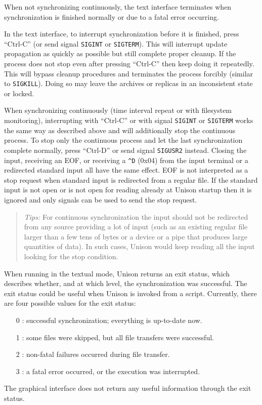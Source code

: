 \documentclass{article}
\begin{document}
\begin{textui}
When not synchronizing continuously, the text interface terminates when
synchronization is finished normally or due to a fatal error occurring.

In the text interface, to interrupt synchronization before it is finished,
press ``Ctrl-C'' (or send signal \verb|SIGINT| or \verb|SIGTERM|). This will
interrupt update propagation as quickly as possible but still complete proper
cleanup. If the process does not stop even after pressing ``Ctrl-C'' then keep
doing it repeatedly.  This will bypass cleanup procedures and terminates the
process forcibly (similar to \verb|SIGKILL|).  Doing so may leave the archives
or replicas in an inconsistent state or locked.

When synchronizing continuously (time interval repeat or with filesystem
monitoring), interrupting with ``Ctrl-C'' or with signal \verb|SIGINT| or
\verb|SIGTERM| works the same way as described above and will additionally stop
the continuous process. To stop only the continuous process and let the last
synchronization complete normally, press ``Ctrl-D'' or send signal
\verb|SIGUSR2| instead.
Closing the input, receiving an EOF, or receiving a \verb|^D| (0x04) from the
input terminal or a redirected standard input all have the same effect. EOF is
not interpreted as a stop request when standard input is redirected from a
regular file. If the standard input is not open or is not open for reading
already at Unison startup then it is ignored and only signals can be used to
send the stop request.

\begin{quote}
  {\em Tips:} For continuous synchronization the input should not be redirected
  from any source providing a lot of input (such as an existing regular file
  larger than a few tens of bytes or a device or a pipe that produces large
  quantities of data). In such cases, Unison would keep reading all the input
  looking for the stop condition.
\end{quote}
\end{textui}


When running in the textual mode, Unison returns an exit status, which
describes whether, and at which level, the synchronization was successful.
The exit status could be useful when Unison is invoked from a script.
Currently, there are four possible values for the exit status:
\begin{itemize}
\item [0]: successful synchronization; everything is up-to-date now.
\item [1]: some files were skipped, but all file transfers were successful.
\item [2]: non-fatal failures occurred during file transfer.
\item [3]: a fatal error occurred, or the execution was interrupted.
\end{itemize}
The graphical interface does not return any useful information through the
exit status.
\end{document}
